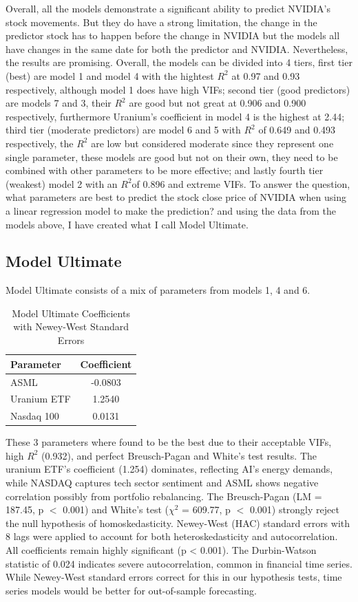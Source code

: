\documentclass[12pt]{article}
\begin{document}
Overall, all the models demonstrate a significant ability to predict NVIDIA's stock movements. But they do have a strong limitation, the change in the predictor stock has to happen before the change in NVIDIA but the models all have changes in the same date for both the predictor and NVIDIA. Nevertheless, the results are promising. Overall, the models can be divided into 4 tiers, first tier (best) are model 1 and model 4 with the hightest $R^2$ at 0.97 and 0.93 respectively, although model 1 does have high VIFs; second tier (good predictors) are models 7 and 3, their $R^2$ are good but not great at 0.906 and 0.900 respectively, furthermore Uranium's coefficient in model 4 is the highest at 2.44; third tier (moderate predictors) are model 6 and 5 with $R^2$ of 0.649 and 0.493 respectively, the $R^2$ are low but considered moderate since they represent one single parameter, these models are good but not on their own, they need to be combined with other parameters to be more effective; and lastly fourth tier (weakest) model 2 with an $R^2$of 0.896 and extreme VIFs. To answer the question, what parameters are best to predict the stock close price of NVIDIA when using a linear regression model to make the prediction? and using the data from the models above, I have created what I call Model Ultimate. 

\subsection{Model Ultimate}

Model Ultimate consists of a mix of parameters from models 1, 4 and 6. 

\begin{table}[h]
\centering
\begin{tabular}{lc}
\hline
\textbf{Parameter} & \textbf{Coefficient} \\
\hline
ASML & -0.0803 \\
Uranium ETF   & 1.2540 \\
Nasdaq 100 & 0.0131 \\
\hline
\end{tabular}
\caption{Model Ultimate Coefficients with Newey-West Standard Errors}
\end{table}

These 3 parameters where found to be the best due to their acceptable VIFs, high $R^2$ (0.932), and perfect Breusch-Pagan and White's test results. The uranium ETF's coefficient (1.254) dominates, reflecting AI's energy demands, while NASDAQ captures tech sector sentiment and ASML shows negative correlation possibly from portfolio rebalancing. The Breusch-Pagan (LM = 187.45, p $<$ 0.001) and White's test ($\chi^2$ = 609.77, p $<$ 0.001) strongly reject the null hypothesis of homoskedasticity. Newey-West (HAC) standard errors with 8 lags were applied to account for both heteroskedasticity and autocorrelation. All coefficients remain highly significant (p < 0.001). The Durbin-Watson statistic of 0.024 indicates severe autocorrelation, common in financial time series. While Newey-West standard errors correct for this in our hypothesis tests, time series models would be better for out-of-sample forecasting.
\end{document}
